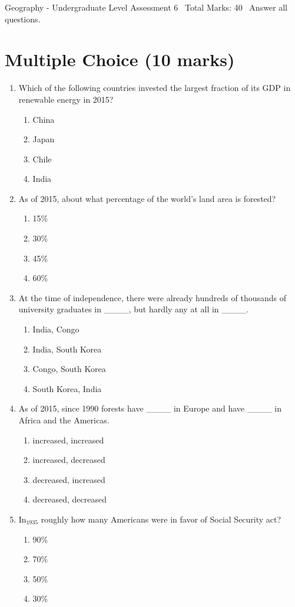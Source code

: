 \documentclass[12pt]{article}
\begin{document}
\begin{center}
Geography - Undergraduate Level Assessment 6 \
Total Marks: 40 \
Answer all questions.
\end{center}

\section*{Multiple Choice (10 marks)}
\begin{enumerate}[label=\arabic*.]
\item Which of the following countries invested the largest fraction of its GDP in renewable energy in 2015?
\begin{enumerate}[label=(\alph*)]
    \item China
    \item Japan
    \item Chile
    \item India
\end{enumerate}
\item As of 2015, about what percentage of the world's land area is forested?
\begin{enumerate}[label=(\alph*)]
    \item 15\%
    \item 30\%
    \item 45\%
    \item 60\%
\end{enumerate}
\item At the time of independence, there were already hundreds of thousands of university graduates in \_\_\_\_, but hardly any at all in \_\_\_\_.
\begin{enumerate}[label=(\alph*)]
    \item India, Congo
    \item India, South Korea
    \item Congo, South Korea
    \item South Korea, India
\end{enumerate}
\item As of 2015, since 1990 forests have \_\_\_\_ in Europe and have \_\_\_\_ in Africa and the Americas.
\begin{enumerate}[label=(\alph*)]
    \item increased, increased
    \item increased, decreased
    \item decreased, increased
    \item decreased, decreased
\end{enumerate}
\item In$_{1935}$ roughly how many Americans were in favor of Social Security act?
\begin{enumerate}[label=(\alph*)]
    \item 90\%
    \item 70\%
    \item 50\%
    \item 30\%
\end{enumerate}
\end{enumerate}
\end{document}

